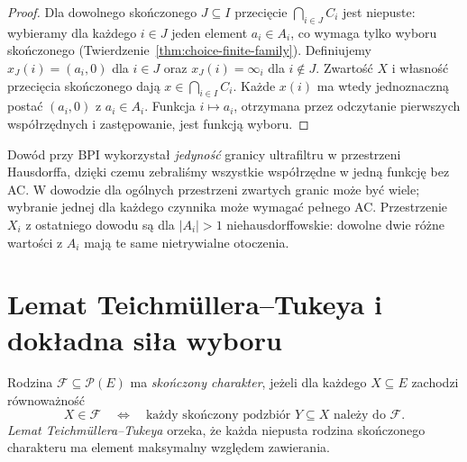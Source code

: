 \begin{proof}
Dla dowolnego skończonego $J\subseteq I$
przecięcie $\bigcap_{i\in J}C_i$
jest niepuste: wybieramy dla każdego
$i\in J$ jeden element $a_i\in A_i$,
co wymaga tylko wyboru skończonego
(Twierdzenie~\ref{thm:choice-finite-family}).
Definiujemy $x_J(i)=(a_i,0)$ dla
$i\in J$ oraz $x_J(i)=\infty_i$
dla $i\notin J$.
Zwartość $X$ i własność przecięcia skończonego
dają $x\in\bigcap_{i\in I}C_i$.
Każde $x(i)$ ma wtedy jednoznaczną postać
$(a_i,0)$ z $a_i\in A_i$.
Funkcja $i\mapsto a_i$, otrzymana przez
odczytanie pierwszych współrzędnych
i zastępowanie, jest funkcją wyboru.
\end{proof}

\begin{uwaga}
Dowód przy BPI wykorzystał \emph{jedyność} granicy
ultrafiltru w przestrzeni Hausdorffa, dzięki czemu
zebraliśmy wszystkie współrzędne w jedną funkcję
bez AC. W dowodzie dla ogólnych przestrzeni zwartych
granic może być wiele; wybranie jednej dla każdego
czynnika może wymagać pełnego AC.
Przestrzenie $X_i$ z ostatniego dowodu są dla
$|A_i|>1$ niehausdorffowskie: dowolne dwie różne
wartości z $A_i$ mają te same nietrywialne otoczenia.
\end{uwaga}

\section{Lemat Teichmüllera--Tukeya i dokładna siła wyboru}
\label{sec:weak-choice-tukey}
\begin{definicja}
\label{def:tukey-finite-character}
Rodzina $\mathcal F\subseteq\mathcal P(E)$ ma
\emph{skończony charakter}, jeżeli dla każdego
$X\subseteq E$ zachodzi równoważność
\[
X\in\mathcal F\quad\Longleftrightarrow\quad
\text{każdy skończony podzbiór }Y\subseteq X\text{ należy do }\mathcal F.
\]
\emph{Lemat Teichmüllera--Tukeya} orzeka, że każda
niepusta rodzina skończonego charakteru ma element
maksymalny względem zawierania.
\end{definicja}

